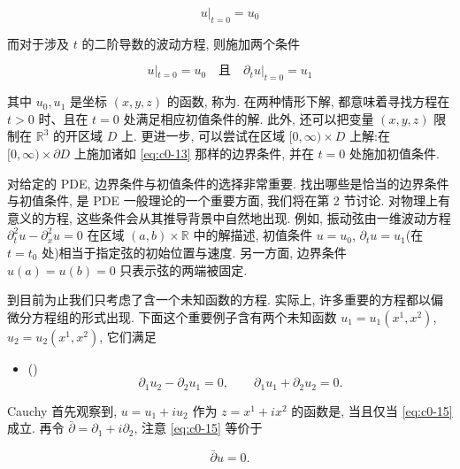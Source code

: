 \[
u|_{t = 0} = u_{0}
\]

而对于涉及 $t$ 的二阶导数的波动方程, 则施加两个条件

\begin{equation}\label{eq:c0-14}
u|_{t = 0} = u_{0} \quad \text{且} \quad \partial_{t} u|_{t = 0} = u_{1}
\end{equation}

其中 $u_{0}, u_{1}$ 是坐标 $(x, y, z)$ 的函数, 称为.
在两种情形下解, 都意味着寻找方程在 $t > 0$ 时、且在 $t = 0$ 处满足相应初值条件的解.
此外, 还可以把变量 $(x, y, z)$ 限制在 $\mathbb{R}^{3}$ 的开区域 $D$ 上.
更进一步, 可以尝试在区域 $[0, \infty) \times D$ 上解:在 $[0, \infty) \times \partial D$ 上施加诸如 \eqref{eq:c0-13} 那样的边界条件, 并在 $t = 0$ 处施加初值条件.

对给定的 PDE, 边界条件与初值条件的选择非常重要.
找出哪些是恰当的边界条件与初值条件, 是 PDE 一般理论的一个重要方面, 我们将在第 2 节讨论.
对物理上有意义的方程, 这些条件会从其推导背景中自然地出现.
例如, 振动弦由一维波动方程 $\partial_{t}^{2} u - \partial_{x}^{2} u = 0$ 在区域 $(a, b) \times \mathbb{R}$ 中的解描述, 初值条件 $u = u_{0}$, $\partial_{t} u = u_{1}$(在 $t = t_{0}$ 处)相当于指定弦的初始位置与速度.
另一方面, 边界条件 $u(a) = u(b) = 0$ 只表示弦的两端被固定.

到目前为止我们只考虑了含一个未知函数的方程.
实际上, 许多重要的方程都以偏微分方程组的形式出现.
下面这个重要例子含有两个未知函数 $u_{1} = u_{1}(x^{1}, x^{2})$, $u_{2} = u_{2}(x^{1}, x^{2})$, 它们满足

\begin{itemize}
\item ()
\begin{equation}\label{eq:c0-15}
\partial_{1} u_{2} - \partial_{2} u_{1} = 0, \qquad \partial_{1} u_{1} + \partial_{2} u_{2} = 0.
\end{equation}
\end{itemize}

Cauchy 首先观察到, $u = u_{1} + i u_{2}$ 作为 $z = x^{1} + i x^{2}$ 的函数是, 当且仅当 \eqref{eq:c0-15} 成立.
再令 $\bar{\partial} = \partial_{1} + i \partial_{2}$, 注意 \eqref{eq:c0-15} 等价于

\begin{equation}\label{eq:c0-16}
\bar{\partial} u = 0.
\end{equation}

